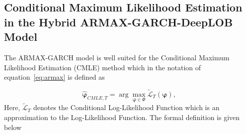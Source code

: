 \documentclass[10pt,a4paper,oneside]{article}
\begin{document}
\subsection{Conditional Maximum Likelihood Estimation in the Hybrid ARMAX-GARCH-DeepLOB Model}
\label{subsec:cmle_props_paper}
The ARMAX-GARCH model is well suited for the Conditional Maximum Likelihood Estimation (CMLE) method which in the notation of equation~\eqref{eq:armax} is defined as

$$
    \hat{\boldsymbol{\varphi}}_{CMLE, T} = \arg\max_{\boldsymbol{\varphi} \in \Phi} {\tilde{\mathcal{L}}_{T}}(\boldsymbol{\varphi}),
$$
Here, $\tilde{\mathcal{L}}_{T}$ denotes the Conditional Log-Likelihood Function which is an approximation to the Log-Likelihood Function. The formal definition is given below
\end{document}
